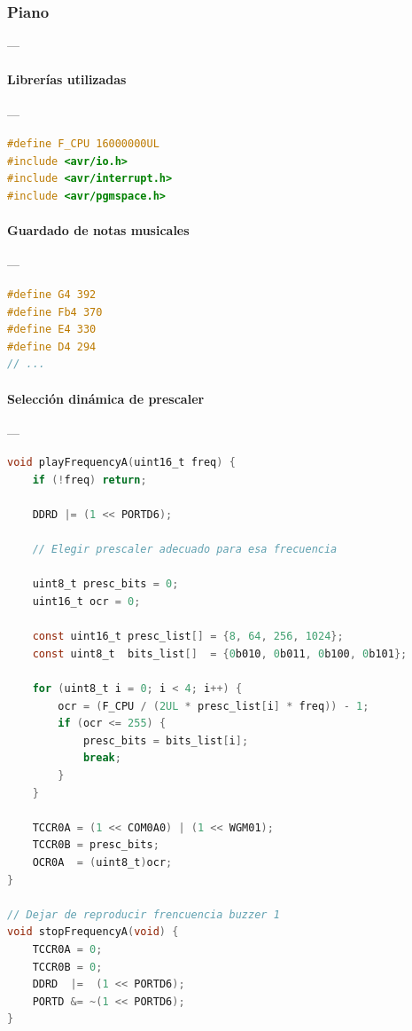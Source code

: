 \subsubsection{\textbf{Piano}}---

\paragraph{Librerías utilizadas}---\\
\begin{lstlisting}[language=C, caption={Librerías utilizadas}]
#define F_CPU 16000000UL
#include <avr/io.h>
#include <avr/interrupt.h>
#include <avr/pgmspace.h>
\end{lstlisting}


\paragraph{Guardado de notas musicales}\label{anexo:notas_musicales}---\\
\begin{lstlisting}[language=C, caption={Selección dinámica de prescaler}]
#define G4 392	
#define Fb4 370	
#define E4 330	
#define D4 294	
// ...
\end{lstlisting}

\paragraph{Selección dinámica de prescaler}\label{anexo:piano_prescaler}---\\
\begin{lstlisting}[language=C, caption={Selección dinámica de prescaler}]
void playFrequencyA(uint16_t freq) {
	if (!freq) return;  

	DDRD |= (1 << PORTD6);
	
	// Elegir prescaler adecuado para esa frecuencia

	uint8_t presc_bits = 0;     
	uint16_t ocr = 0;

	const uint16_t presc_list[] = {8, 64, 256, 1024};
	const uint8_t  bits_list[]  = {0b010, 0b011, 0b100, 0b101};

	for (uint8_t i = 0; i < 4; i++) {
		ocr = (F_CPU / (2UL * presc_list[i] * freq)) - 1;
		if (ocr <= 255) {
			presc_bits = bits_list[i];
			break;
		}
	}

	TCCR0A = (1 << COM0A0) | (1 << WGM01);
	TCCR0B = presc_bits;          
	OCR0A  = (uint8_t)ocr;        
}

// Dejar de reproducir frencuencia buzzer 1
void stopFrequencyA(void) {
	TCCR0A = 0;
	TCCR0B = 0;
	DDRD  |=  (1 << PORTD6);
	PORTD &= ~(1 << PORTD6);
}
\end{lstlisting}



